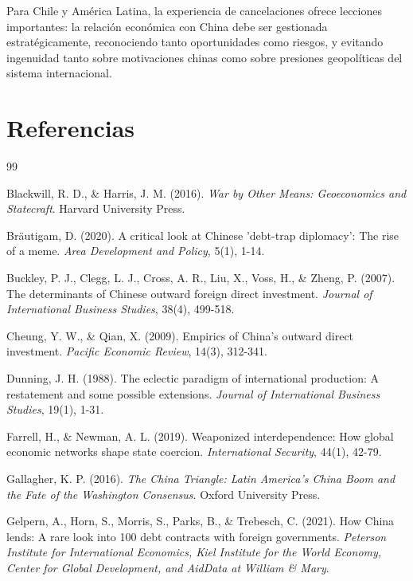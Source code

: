 \documentclass[12pt]{article}
\begin{document}
Para Chile y América Latina, la experiencia de cancelaciones ofrece lecciones importantes: la relación económica con China debe ser gestionada estratégicamente, reconociendo tanto oportunidades como riesgos, y evitando ingenuidad tanto sobre motivaciones chinas como sobre presiones geopolíticas del sistema internacional.

\section*{Referencias}

\begin{thebibliography}{99}

Blackwill, R. D., \& Harris, J. M. (2016). \textit{War by Other Means: Geoeconomics and Statecraft}. Harvard University Press.

Bräutigam, D. (2020). A critical look at Chinese 'debt-trap diplomacy': The rise of a meme. \textit{Area Development and Policy}, 5(1), 1-14.

Buckley, P. J., Clegg, L. J., Cross, A. R., Liu, X., Voss, H., \& Zheng, P. (2007). The determinants of Chinese outward foreign direct investment. \textit{Journal of International Business Studies}, 38(4), 499-518.

Cheung, Y. W., \& Qian, X. (2009). Empirics of China's outward direct investment. \textit{Pacific Economic Review}, 14(3), 312-341.

Dunning, J. H. (1988). The eclectic paradigm of international production: A restatement and some possible extensions. \textit{Journal of International Business Studies}, 19(1), 1-31.

Farrell, H., \& Newman, A. L. (2019). Weaponized interdependence: How global economic networks shape state coercion. \textit{International Security}, 44(1), 42-79.

Gallagher, K. P. (2016). \textit{The China Triangle: Latin America's China Boom and the Fate of the Washington Consensus}. Oxford University Press.

Gelpern, A., Horn, S., Morris, S., Parks, B., \& Trebesch, C. (2021). How China lends: A rare look into 100 debt contracts with foreign governments. \textit{Peterson Institute for International Economics, Kiel Institute for the World Economy, Center for Global Development, and AidData at William & Mary}.


\end{thebibliography}
\end{document}
